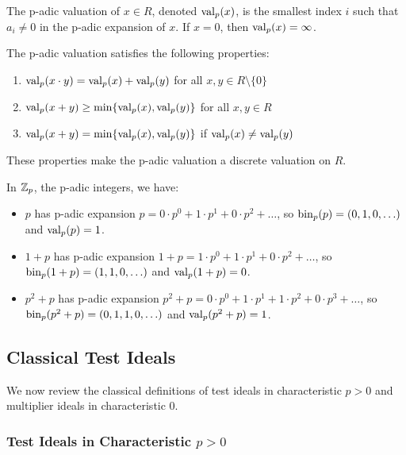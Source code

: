 \begin{definition}\label{def:p-adic-valuation}
The p-adic valuation of $x \in R$, denoted $\operatorname{val}_p(x)$, is the smallest index $i$ such that $a_i \neq 0$ in the p-adic expansion of $x$. If $x = 0$, then $\operatorname{val}_p(x) = \infty$.
\end{definition}

The p-adic valuation satisfies the following properties:
\begin{enumerate}
    \item $\operatorname{val}_p(x \cdot y) = \operatorname{val}_p(x) + \operatorname{val}_p(y)$ for all $x, y \in R \setminus \{0\}$
    \item $\operatorname{val}_p(x + y) \geq \min\{\operatorname{val}_p(x), \operatorname{val}_p(y)\}$ for all $x, y \in R$
    \item $\operatorname{val}_p(x + y) = \min\{\operatorname{val}_p(x), \operatorname{val}_p(y)\}$ if $\operatorname{val}_p(x) \neq \operatorname{val}_p(y)$
\end{enumerate}

These properties make the p-adic valuation a discrete valuation on $R$.

\begin{example}\label{ex:p-adic-expansion}
In $\mathbb{Z}_p$, the p-adic integers, we have:
\begin{itemize}
    \item $p$ has p-adic expansion $p = 0 \cdot p^0 + 1 \cdot p^1 + 0 \cdot p^2 + \ldots$, so $\operatorname{bin}_p(p) = (0, 1, 0, \ldots)$ and $\operatorname{val}_p(p) = 1$.
    \item $1 + p$ has p-adic expansion $1 + p = 1 \cdot p^0 + 1 \cdot p^1 + 0 \cdot p^2 + \ldots$, so $\operatorname{bin}_p(1+p) = (1, 1, 0, \ldots)$ and $\operatorname{val}_p(1+p) = 0$.
    \item $p^2 + p$ has p-adic expansion $p^2 + p = 0 \cdot p^0 + 1 \cdot p^1 + 1 \cdot p^2 + 0 \cdot p^3 + \ldots$, so $\operatorname{bin}_p(p^2+p) = (0, 1, 1, 0, \ldots)$ and $\operatorname{val}_p(p^2+p) = 1$.
\end{itemize}
\end{example}

\subsection{Classical Test Ideals}

We now review the classical definitions of test ideals in characteristic $p > 0$ and multiplier ideals in characteristic 0.

\subsubsection{Test Ideals in Characteristic $p > 0$}

